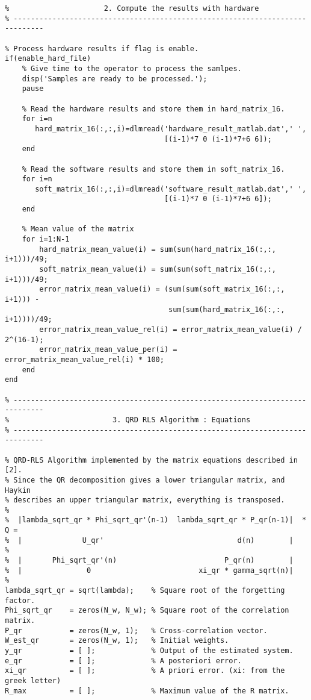 \begin{lstlisting}[style=C]
% -----------------------------------------------------------------------------
%                      2. Compute the results with hardware
% -----------------------------------------------------------------------------

% Process hardware results if flag is enable.
if(enable_hard_file)
    % Give time to the operator to process the samlpes.
    disp('Samples are ready to be processed.');
    pause

    % Read the hardware results and store them in hard_matrix_16.
    for i=n
       hard_matrix_16(:,:,i)=dlmread('hardware_result_matlab.dat',' ',
                                     [(i-1)*7 0 (i-1)*7+6 6]);
    end

    % Read the software results and store them in soft_matrix_16.
    for i=n
       soft_matrix_16(:,:,i)=dlmread('software_result_matlab.dat',' ',
                                     [(i-1)*7 0 (i-1)*7+6 6]);
    end

    % Mean value of the matrix
    for i=1:N-1
        hard_matrix_mean_value(i) = sum(sum(hard_matrix_16(:,:, i+1)))/49;
        soft_matrix_mean_value(i) = sum(sum(soft_matrix_16(:,:, i+1)))/49;
        error_matrix_mean_value(i) = (sum(sum(soft_matrix_16(:,:, i+1))) - 
                                      sum(sum(hard_matrix_16(:,:, i+1))))/49;
        error_matrix_mean_value_rel(i) = error_matrix_mean_value(i) / 2^(16-1);
        error_matrix_mean_value_per(i) = error_matrix_mean_value_rel(i) * 100;
    end
end

% -----------------------------------------------------------------------------
%                        3. QRD RLS Algorithm : Equations
% -----------------------------------------------------------------------------

% QRD-RLS Algorithm implemented by the matrix equations described in [2].
% Since the QR decomposition gives a lower triangular matrix, and Haykin
% describes an upper triangular matrix, everything is transposed.
%
%  |lambda_sqrt_qr * Phi_sqrt_qr'(n-1)  lambda_sqrt_qr * P_qr(n-1)|  *  Q = 
%  |              U_qr'                               d(n)        |
%
%  |       Phi_sqrt_qr'(n)                         P_qr(n)        |
%  |               0                         xi_qr * gamma_sqrt(n)|
%
lambda_sqrt_qr = sqrt(lambda);    % Square root of the forgetting factor.
Phi_sqrt_qr    = zeros(N_w, N_w); % Square root of the correlation matrix.
P_qr           = zeros(N_w, 1);   % Cross-correlation vector.
W_est_qr       = zeros(N_w, 1);   % Initial weights.
y_qr           = [ ];             % Output of the estimated system.
e_qr           = [ ];             % A posteriori error.
xi_qr          = [ ];             % A priori error. (xi: from the greek letter)
R_max          = [ ];             % Maximum value of the R matrix.


\end{lstlisting}
